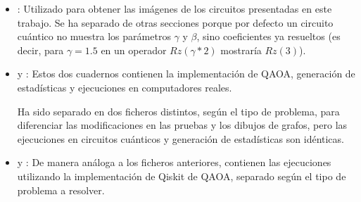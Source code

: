 \begin{itemize}
\item {}: Utilizado para obtener las imágenes de los circuitos presentadas en este trabajo.
  Se ha separado de otras secciones porque por defecto un circuito cuántico no muestra los parámetros $\gamma$ y $\beta$, sino coeficientes ya resueltos (es decir, para $\gamma = 1.5$ en un operador $Rz(\gamma*2)$ mostraría $Rz(3)$).

\item {} y : Estos dos cuadernos contienen la implementación de QAOA, generación de estadísticas y ejecuciones en computadores reales.
  
  Ha sido separado en dos ficheros distintos, según el tipo de problema, para diferenciar las modificaciones en las pruebas y los dibujos de grafos, pero las ejecuciones en circuitos cuánticos y generación de estadísticas son idénticas.
  
\item {} y : De manera análoga a los ficheros anteriores, contienen las ejecuciones utilizando la implementación de Qiskit de QAOA, separado según el tipo de problema a resolver.
\end{itemize}


